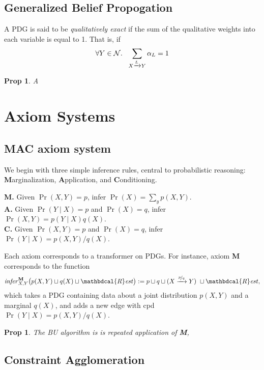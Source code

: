 \documentclass{article}
\theoremstyle{plain}
\newtheorem{prop}[theorem]{Prop}
\theoremstyle{definition}
\theoremstyle{remark}
\newcommand{\N}{\mathcal N}
\newcommand{\dg}[1]{\mathbdcal{#1}}
\newcommand{\bundle}{\mathbin{\sqcup}}
\newcommand{\ed}[3]{%
		\mathchoice%
		{#2\overset{\smash{\mskip-5mu\raisebox{-3pt}{${#1}$}}}{\xrightarrow{\hphantom{\scriptstyle {#1}}}} #3} %
		{#2\overset{\smash{\mskip-5mu\raisebox{-3pt}{$\scriptstyle {#1}$}}}{\xrightarrow{\hphantom{\scriptstyle {#1}}}} #3}%
		{#2\overset{\smash{\mskip-5mu\raisebox{-3pt}{$\scriptscriptstyle {#1}$}}}{\xrightarrow{\hphantom{\scriptscriptstyle {#1}}}} #3} %
		{#2\overset{\smash{\mskip-5mu\raisebox{-3pt}{$\scriptscriptstyle {#1}$}}}{\xrightarrow{\hphantom{\scriptscriptstyle {#1}}}} #3}} %
\newcommand{\alle}[1][L]{_{\ed {#1}XY}}
\begin{document}
\subsection{Generalized Belief Propogation}

\begin{defn}
	A PDG is said to be \emph{qualitatively exact} if the sum of the qualitative weights into each variable is equal to 1.
	That is, if
	\[ \forall Y \in \N.~~ \sum\alle \alpha_{L} = 1  \]
\end{defn}

\begin{prop}
	A
\end{prop}

\section{Axiom Systems}

\subsection{MAC axiom system}
We begin with three simple inference rules, central to probabilistic reasoning: \textbf Marginalization, \textbf Application, and \textbf Conditioning.

\textbf{M.} Given $\Pr(X,Y) = p$, infer $\Pr(X) = \sum_y p(X,Y)$. \\
\textbf{A.} Given $\Pr(Y \mid X) = p$ and $\Pr(X) = q$, infer $\Pr(X, Y) = p(Y \mid X) q(X)$. \\
\textbf{C.} Given $\Pr(X,Y) = p$ and $\Pr(X) = q$, infer $\Pr(Y \mid X) = p(X,Y) / q(X)$.

Each axiom corresponds to a transformer on PDGs. For instance, axiom \textbf{M} corresponds to the function
\[ \mathit{infer}^{\textbf{M}}_{X,Y} \big(p(X,Y) \bundle q(X) \bundle \dg R\mathit{est} \big)
	:=  p \bundle q \bundle  (X \xrightarrow{\nicefrac pq} Y)~\bundle \dg R\mathit{est}, \]
which takes a PDG containing data about a joint distribution $p(X,Y)$ and a marginal $q(X)$, and adds a new edge with cpd $\Pr(Y \mid X) = p(X,Y)/ q(X)$.

\begin{prop}
	The BU algorithm is is repeated application of \textbf{M},
\end{prop}

\subsection{Constraint Agglomeration}
\end{document}
